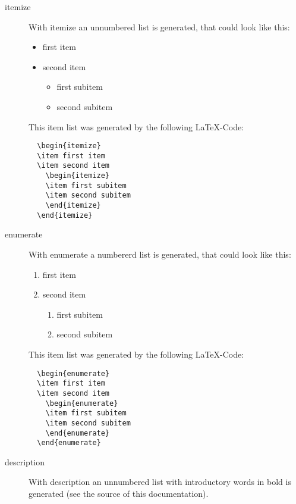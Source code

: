 \begin{description}
\item [itemize] With itemize an unnumbered list is generated,
   that could look like this:
  \begin{itemize}
  \item first item
  \item second item
    \begin{itemize}
    \item first subitem
    \item second subitem
    \end{itemize}
  \end{itemize}

This item list was generated by the following \LaTeX-Code:
\begin{verbatim}
  \begin{itemize}
  \item first item
  \item second item
    \begin{itemize}
    \item first subitem
    \item second subitem
    \end{itemize}
  \end{itemize}
\end{verbatim}

\item [enumerate] With enumerate a numbererd list is generated,
  that could look like this:
  \begin{enumerate}
  \item first item
  \item second item
    \begin{enumerate}
    \item first subitem
    \item second subitem
    \end{enumerate}
  \end{enumerate}

This item list was generated by the following \LaTeX-Code:
\begin{verbatim}
  \begin{enumerate}
  \item first item
  \item second item
    \begin{enumerate}
    \item first subitem
    \item second subitem
    \end{enumerate}
  \end{enumerate}
\end{verbatim}

\item[description] With description an unnumbered list with
  introductory words in bold is generated (see the
  source of this documentation).
\end{description}


